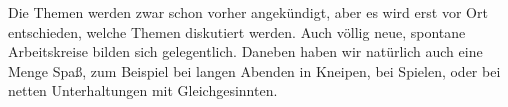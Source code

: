 Die Themen werden zwar schon vorher angekündigt, aber es wird erst vor Ort entschieden, welche Themen diskutiert werden.
Auch völlig neue, spontane Arbeitskreise bilden sich gelegentlich.
Daneben haben wir natürlich auch eine Menge Spaß, zum Beispiel bei
langen Abenden in Kneipen, bei Spielen,
oder bei netten Unterhaltungen mit Gleichgesinnten.
